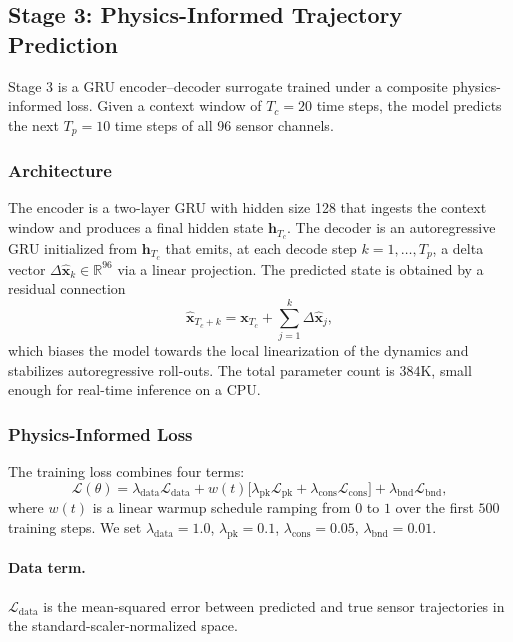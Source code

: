 \subsection{Stage 3: Physics-Informed Trajectory Prediction}
\label{sec:pinn}

Stage 3 is a GRU encoder--decoder surrogate trained under a composite physics-informed loss. Given a context window of $T_c = 20$ time steps, the model predicts the next $T_p = 10$ time steps of all 96 sensor channels.

\subsubsection{Architecture}

The encoder is a two-layer GRU with hidden size 128 that ingests the context window and produces a final hidden state $\mathbf{h}_{T_c}$. The decoder is an autoregressive GRU initialized from $\mathbf{h}_{T_c}$ that emits, at each decode step $k = 1, \dots, T_p$, a delta vector $\Delta \hat{\mathbf{x}}_k \in \mathbb{R}^{96}$ via a linear projection. The predicted state is obtained by a residual connection
\begin{equation}
    \hat{\mathbf{x}}_{T_c + k} = \mathbf{x}_{T_c} + \sum_{j = 1}^{k} \Delta \hat{\mathbf{x}}_j,
    \label{eq:residual}
\end{equation}
which biases the model towards the local linearization of the dynamics and stabilizes autoregressive roll-outs. The total parameter count is $384$K, small enough for real-time inference on a CPU.

\subsubsection{Physics-Informed Loss}

The training loss combines four terms:
\begin{equation}
    \mathcal{L}(\theta) = \lambda_{\text{data}} \mathcal{L}_{\text{data}} + w(t)\bigl[\lambda_{\text{pk}} \mathcal{L}_{\text{pk}} + \lambda_{\text{cons}} \mathcal{L}_{\text{cons}}\bigr] + \lambda_{\text{bnd}} \mathcal{L}_{\text{bnd}},
    \label{eq:loss}
\end{equation}
where $w(t)$ is a linear warmup schedule ramping from $0$ to $1$ over the first $500$ training steps. We set $\lambda_{\text{data}} = 1.0$, $\lambda_{\text{pk}} = 0.1$, $\lambda_{\text{cons}} = 0.05$, $\lambda_{\text{bnd}} = 0.01$.

\paragraph{Data term.} $\mathcal{L}_{\text{data}}$ is the mean-squared error between predicted and true sensor trajectories in the standard-scaler-normalized space.

